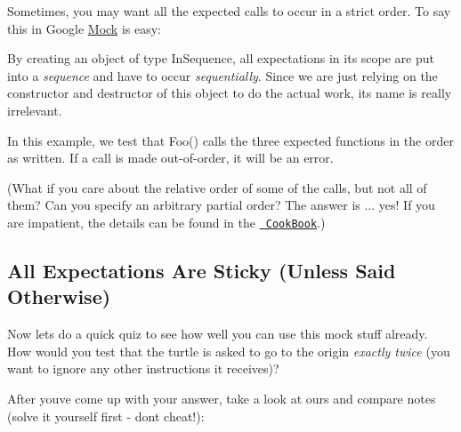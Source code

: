 Sometimes, you may want all the expected calls to occur in a strict order. To say this in Google \mbox{\hyperlink{class_mock}{Mock}} is easy\+:


\begin{DoxyCode}{0}
\DoxyCodeLine{  \{}
\DoxyCodeLine{}
\DoxyCodeLine{  \}}
\DoxyCodeLine{\}}
\end{DoxyCode}


By creating an object of type {\ttfamily In\+Sequence}, all expectations in its scope are put into a {\itshape sequence} and have to occur {\itshape sequentially}. Since we are just relying on the constructor and destructor of this object to do the actual work, its name is really irrelevant.

In this example, we test that {\ttfamily Foo()} calls the three expected functions in the order as written. If a call is made out-\/of-\/order, it will be an error.

(What if you care about the relative order of some of the calls, but not all of them? Can you specify an arbitrary partial order? The answer is ... yes! If you are impatient, the details can be found in the \href{CookBook.md\#expecting-partially-ordered-calls}{\texttt{ Cook\+Book}}.)

\subsection*{All Expectations Are Sticky (Unless Said Otherwise)}

Now let\textquotesingle{}s do a quick quiz to see how well you can use this mock stuff already. How would you test that the turtle is asked to go to the origin {\itshape exactly twice} (you want to ignore any other instructions it receives)?

After you\textquotesingle{}ve come up with your answer, take a look at ours and compare notes (solve it yourself first -\/ don\textquotesingle{}t cheat!)\+:


\begin{DoxyCode}{0}
\end{DoxyCode}


